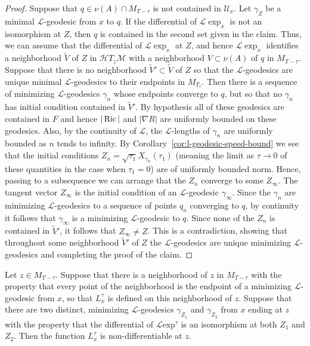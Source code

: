\begin{proof}
\sketch
Suppose that $q\in \nu(A)\cap M_{T-\tau}$ is not contained in ${\mathcal U}_x$.
Let $\gamma_Z$ be a minimal ${\mathcal L}$-geodesic  from $x$ to $q$. If the
differential of ${\mathcal L}\exp_x$ is not an isomorphism at $Z$, then
$q$ is contained in the second set given in the claim. Thus, we can assume that
the differential of ${\mathcal L}\exp_x$ at $Z$, and hence ${\mathcal
L}\exp_x$ identifies a neighborhood $\widetilde V$ of $Z$ in ${\mathcal
H}T_z{\mathcal M}$ with a neighborhood $V\subset \nu(A)$  of $q$ in
$M_{T-\tau}$. Suppose that there is no neighborhood $\widetilde V'\subset
\widetilde V$ of $Z$ so that the ${\mathcal L}$-geodesics are unique minimal
${\mathcal L}$-geodesics to their endpoints in $M_{T_\tau}$. Then there is a
sequence of minimizing ${\mathcal L}$-geodesics $\gamma_n$ whose endpoints
converge to $q$, but so that no $\gamma_n$ has initial condition contained in
$\widetilde V'$. By hypothesis all of these geodesics are contained in $F$ and
hence $|\operatorname{Ric}|$ and $|\nabla R|$ are uniformly bounded on these geodesics.
Also,  by the continuity of ${\mathcal L}$, the ${\mathcal L}$-lengths of
$\gamma_n$ are uniformly bounded as $n$ tends to infinity. By
Corollary~\ref{cor:l-geodesic-speed-bound} we see that the initial conditions
$Z_n=\sqrt{\tau_1}X_{\gamma_n}(\tau_1)$ (meaning the limit as $\tau\rightarrow
0$ of these quantities in the case when $\tau_1=0$) are of uniformly bounded
norm. Hence, passing to a subsequence we can arrange that the $Z_n$ converge to
some $Z_\infty$. The tangent vector $Z_\infty$ is the initial condition of an
${\mathcal L}$-geodesic $\gamma_\infty$. Since the $\gamma_n$ are minimizing
${\mathcal L}$-geodesics to a sequence of points $q_n$ converging to $q$, by
continuity it follows that $\gamma_\infty$ is a minimizing ${\mathcal
L}$-geodesic to $q$. Since none of the $Z_n$ is contained in $\widetilde V'$,
it follows that $Z_\infty\not= Z$. This is a contradiction, showing that
throughout some neighborhood $\widetilde V'$ of $Z$ the ${\mathcal
L}$-geodesics are unique minimizing ${\mathcal L}$-geodesics and completing the
proof of the claim.
\end{proof}

\begin{claim}\label{claim:l-length-nondifferentiable-at-multiple-geodesics}

Let $z\in M_{T-\tau}$. Suppose that there is a neighborhood of $z$ in
$M_{T-\tau}$ with the property that every point of the neighborhood is the
endpoint of a minimizing ${\mathcal L}$-geodesic from $x$, so that $L^\tau_x$
is defined on this neighborhood of $z$. Suppose that there are two distinct,
minimizing ${\mathcal L}$-geodesics $\gamma_{Z_1}$ and $\gamma_{Z_2}$ from $x$
ending at $z$ with the property that the differential of ${\mathcal L}\mathrm{exp}^{\tau}$ is an isomorphism at both $Z_1$ and $Z_2$. Then the function
$L^\tau_x$ is non-differentiable at $z$.
\end{claim}


